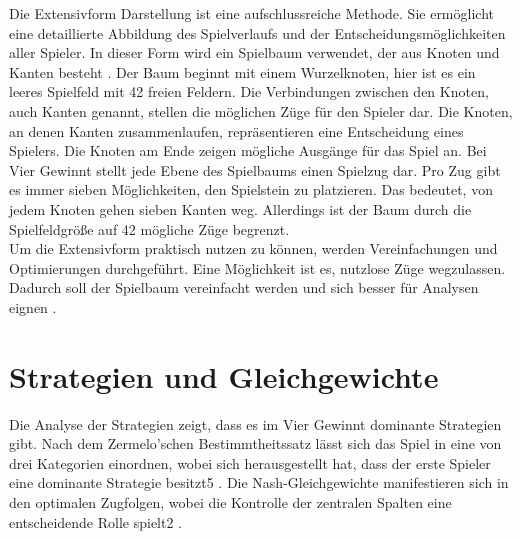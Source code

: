 Die Extensivform Darstellung ist eine aufschlussreiche Methode.
Sie ermöglicht eine detaillierte Abbildung des Spielverlaufs und der Entscheidungsmöglichkeiten aller Spieler.
In dieser Form wird ein Spielbaum verwendet, der aus Knoten und Kanten besteht \autocite{einsiedler2014spieltheorie}. 
Der Baum beginnt mit einem Wurzelknoten, hier ist es ein leeres Spielfeld mit 42 freien Feldern. Die Verbindungen zwischen den Knoten, auch Kanten genannt, stellen die möglichen Züge für den Spieler dar. Die Knoten, an denen Kanten zusammenlaufen, repräsentieren eine Entscheidung eines Spielers. Die Knoten am Ende zeigen mögliche Ausgänge für das Spiel an.
Bei Vier Gewinnt stellt jede Ebene des Spielbaums einen Spielzug dar. Pro Zug gibt es immer sieben Möglichkeiten, den Spielstein zu platzieren. Das bedeutet, von jedem Knoten gehen sieben Kanten weg. Allerdings ist der Baum durch die Spielfeldgröße auf 42 mögliche Züge begrenzt.\\
Um die Extensivform praktisch nutzen zu können, werden Vereinfachungen und Optimierungen durchgeführt. Eine Möglichkeit ist es, nutzlose Züge wegzulassen. Dadurch soll der Spielbaum vereinfacht werden und sich besser für Analysen eignen \autocite{ruile2009viergewinnt}.  


\section{Strategien und Gleichgewichte}
Die Analyse der Strategien zeigt, dass es im Vier Gewinnt dominante Strategien gibt. Nach dem Zermelo'schen Bestimmtheitssatz lässt sich das Spiel in eine von drei Kategorien einordnen, wobei sich herausgestellt hat, dass der erste Spieler eine dominante Strategie besitzt5
. Die Nash-Gleichgewichte manifestieren sich in den optimalen Zugfolgen, wobei die Kontrolle der zentralen Spalten eine entscheidende Rolle spielt2
.


	